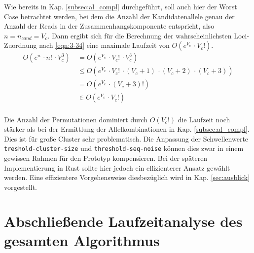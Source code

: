 Wie bereits in Kap. \ref{subsec:al_compl} durchgeführt, soll auch hier der Worst Case betrachtet werden, bei dem die Anzahl der Kandidatenallele genau der Anzahl der Reads in der Zusammenhangskomponente entspricht, also $ n = n_{cand} =V_{c} $. Dann ergibt sich für die Berechnung der wahrscheinlichsten Loci-Zuordnung nach \eqref{eqn:3-34} eine maximale Laufzeit von $ O(e^{V_{c}} \, \cdotp V_{c}!) $.
\begin{equation} \label{eqn:3-34}
\tag{3-34}
\begin{aligned}
O(e^n \, \cdotp n! \, \cdotp V_{c}^3)
&\ {}=O(e^{V_{c}} \, \cdotp V_{c}! \, \cdotp V_{c}^3)\\
&\ \leq O(e^{V_{c}} \, \cdotp V_{c}! \, \cdotp (V_{c} + 1)\, \cdotp (V_{c} + 2)\, \cdotp (V_{c} + 3))\\
&\ =  O(e^{V_{c}} \, \cdotp (V_{c} + 3)!)\\
&\ \in O(e^{V_{c}} \, \cdotp V_{c}!)\\
\end{aligned}
\end{equation}

Die Anzahl der Permutationen dominiert durch $ O(V_{c}!) $ die Laufzeit noch stärker als bei der Ermittlung der Allelkombinationen in Kap. \ref{subsec:al_compl}. Dies ist für große Cluster sehr problematisch. Die Anpassung der Schwellenwerte \lstinline|treshold-cluster-size| und \linebreak \lstinline|threshold-seq-noise| können dies zwar in einem gewissen Rahmen für den Prototyp kompensieren. Bei der späteren Implementierung in Rust sollte hier jedoch ein effizienterer Ansatz gewählt werden. Eine effizientere Vorgehensweise diesbezüglich wird in Kap. \ref{sec:ausblick} vorgestellt.

\section{Abschließende Laufzeitanalyse des gesamten Algorithmus}


